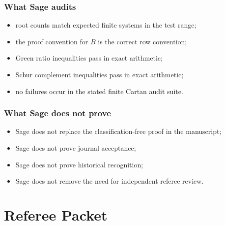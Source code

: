 \documentclass[11pt]{book}
\theoremstyle{definition}
\begin{document}
\section*{What Sage audits}
\begin{itemize}
\item root counts match expected finite systems in the test range;
\item the proof convention for $B$ is the correct row convention;
\item Green ratio inequalities pass in exact arithmetic;
\item Schur complement inequalities pass in exact arithmetic;
\item no failures occur in the stated finite Cartan audit suite.
\end{itemize}

\section*{What Sage does not prove}
\begin{itemize}
\item Sage does not replace the classification-free proof in the manuscript;
\item Sage does not prove journal acceptance;
\item Sage does not prove historical recognition;
\item Sage does not remove the need for independent referee review.
\end{itemize}

\part{Referee Packet}
\end{document}
